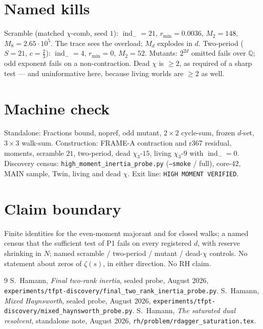 \documentclass[11pt]{article}
\theoremstyle{remark}
\newcommand{\indm}{\operatorname{ind}_{-}}
\begin{document}
\section{Named kills}\label{sec:kills}

Scramble (matched $\chi$-comb, seed $1$): $\indm=21$,
$r_{\min}=0.0036$, $M_2=148$, $M_8=2.65\cdot 10^{5}$.
The trace sees the overload; $M_d$ explodes in $d$.
Two-period ($S=21$, $c=\tfrac23$): $\indm=4$, $r_{\min}=0$,
$M_2=52$.
Mutants: $2^{2d}$ omitted fails over $\mathbb{Q}$; odd
exponent fails on a non-contraction.
Dead $\chi$ is $\ge 2$, as required of a sharp test --- and
uninformative here, because living worlds are $\ge 2$ as well.

\section*{Machine check}

Standalone: Fractions bound, nopref, odd mutant, $2\times 2$
cycle-sum, frozen $d$-set, $3\times 3$ walk-sum.
Construction: FRAME-A contraction and r367 residual,
moments, scramble $21$, two-period, dead $\chi_3$-$15$,
living $\chi_3$-$9$ with $\indm=0$.
Discovery census: \texttt{high\_moment\_inertia\_probe.py}
(\texttt{--smoke} / full), core-$42$, MAIN sample, Twin,
living and dead $\chi$.
Exit line: \texttt{HIGH MOMENT VERIFIED}.

\section*{Claim boundary}

Finite identities for the even-moment majorant and for closed
walks; a named census that the sufficient test of P1 fails on
every registered $d$, with reserve shrinking in $N$; named
scramble / two-period / mutant / dead-$\chi$ controls.
No statement about zeros of $\zeta(s)$, in either direction.
No RH claim.

\begin{thebibliography}{9}
S.~Hamann,
\textit{Final two-rank inertia},
sealed probe, August 2026,
\texttt{experiments/tfpt-discovery/final\_two\_rank\_inertia\_probe.py}.
S.~Hamann,
\textit{Mixed Haynsworth},
sealed probe, August 2026,
\texttt{experiments/tfpt-discovery/mixed\_haynsworth\_probe.py}.
S.~Hamann,
\textit{The saturated dual resolvent},
standalone note, August 2026,
\texttt{rh/problem/rdagger\_saturation.tex}.
\end{thebibliography}
\end{document}
